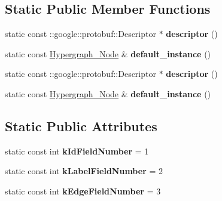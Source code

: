 \subsection*{Static Public Member Functions}
\begin{DoxyCompactItemize}
\item 
\hypertarget{classHypergraph__Node_af8c74ba69c3a67dc7ef5f1ba816a7f35}{
static const ::google::protobuf::Descriptor $\ast$ {\bfseries descriptor} ()}
\label{classHypergraph__Node_af8c74ba69c3a67dc7ef5f1ba816a7f35}

\item 
\hypertarget{classHypergraph__Node_a938861e0ccae279a5df0c0eb7364c423}{
static const \hyperlink{classHypergraph__Node}{Hypergraph\_\-Node} \& {\bfseries default\_\-instance} ()}
\label{classHypergraph__Node_a938861e0ccae279a5df0c0eb7364c423}

\item 
\hypertarget{classHypergraph__Node_af8c74ba69c3a67dc7ef5f1ba816a7f35}{
static const ::google::protobuf::Descriptor $\ast$ {\bfseries descriptor} ()}
\label{classHypergraph__Node_af8c74ba69c3a67dc7ef5f1ba816a7f35}

\item 
\hypertarget{classHypergraph__Node_a938861e0ccae279a5df0c0eb7364c423}{
static const \hyperlink{classHypergraph__Node}{Hypergraph\_\-Node} \& {\bfseries default\_\-instance} ()}
\label{classHypergraph__Node_a938861e0ccae279a5df0c0eb7364c423}

\end{DoxyCompactItemize}
\subsection*{Static Public Attributes}
\begin{DoxyCompactItemize}
\item 
\hypertarget{classHypergraph__Node_a02f37c3292bd8fabd0ba4a19361af78d}{
static const int {\bfseries kIdFieldNumber} = 1}
\label{classHypergraph__Node_a02f37c3292bd8fabd0ba4a19361af78d}

\item 
\hypertarget{classHypergraph__Node_ad231ad3931e876829c3cf9d3c139d862}{
static const int {\bfseries kLabelFieldNumber} = 2}
\label{classHypergraph__Node_ad231ad3931e876829c3cf9d3c139d862}

\item 
\hypertarget{classHypergraph__Node_ab2407c760d8d8d60fa85583555b6f652}{
static const int {\bfseries kEdgeFieldNumber} = 3}
\label{classHypergraph__Node_ab2407c760d8d8d60fa85583555b6f652}

\end{DoxyCompactItemize}
